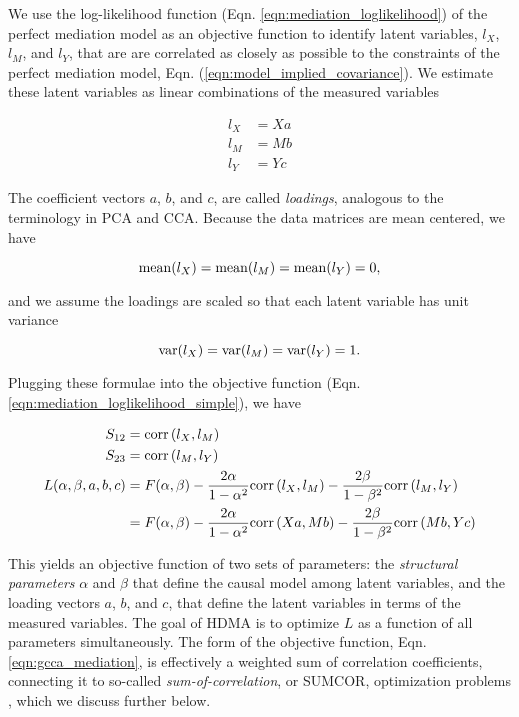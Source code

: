 \documentclass[
]{article}
\begin{document}
We use the log-likelihood function (Eqn.
\ref{eqn:mediation_loglikelihood}) of the perfect mediation model as an
objective function to identify latent variables, \(l_X\), \(l_M\), and
\(l_Y\), that are are correlated as closely as possible to the
constraints of the perfect mediation model, Eqn.
(\ref{eqn:model_implied_covariance}). We estimate these latent variables
as linear combinations of the measured variables

\begin{align}
l_X &= Xa \\
l_M &= Mb \\
l_Y &= Yc
\end{align}

The coefficient vectors \(a\), \(b\), and \(c\), are called
\textit{loadings}, analogous to the terminology in PCA and CCA. Because
the data matrices are mean centered, we have

\begin{equation}
{\rm mean}(l_X) = {\rm mean}(l_M) = {\rm mean}(l_Y) = 0,
\end{equation}

and we assume the loadings are scaled so that each latent variable has
unit variance

\begin{equation}
{\rm var}(l_X) = {\rm var}(l_M) = {\rm var}(l_Y) = 1.
\end{equation}

Plugging these formulae into the objective function (Eqn.
\ref{eqn:mediation_loglikelihood_simple}), we have

\begin{align}
S_{12} &= {\rm corr}\left(l_X, l_M\right)\\
S_{23} &= {\rm corr}\left(l_M, l_Y\right)\\
\label{eqn:gcca_mediation}
L(\alpha, \beta, a,b,c) &= F(\alpha, \beta) - \frac{2\alpha}{1-\alpha^2} {\rm corr}\left(l_X, l_M\right) - \frac{2\beta}{1-\beta^2} {\rm corr}\left(l_M, l_Y\right) \\ 
&= F(\alpha, \beta) - \frac{2\alpha}{1-\alpha^2} {\rm corr}\left(Xa, Mb\right) - \frac{2\beta}{1-\beta^2} {\rm corr}\left(Mb, Yc\right)
\end{align}

This yields an objective function of two sets of parameters: the
\textit{structural parameters} \(\alpha\) and \(\beta\) that define the
causal model among latent variables, and the loading vectors \(a\),
\(b\), and \(c\), that define the latent variables in terms of the
measured variables. The goal of HDMA is to optimize \(L\) as a function
of all parameters simultaneously. The form of the objective function,
Eqn. \ref{eqn:gcca_mediation}, is effectively a weighted sum of
correlation coefficients, connecting it to so-called
\textit{sum-of-correlation}, or SUMCOR, optimization problems
\cite{tenenhaus2011regularized}, which we discuss further below.
\end{document}
